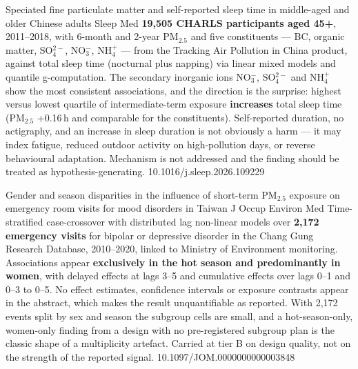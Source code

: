 \documentclass[10pt]{article}
\begin{document}
\clearpage


{Speciated fine particulate matter and self-reported sleep time in middle-aged and older
Chinese adults}
{Sleep Med}
{\textbf{19{,}505 CHARLS participants aged 45+}, 2011--2018, with 6-month and 2-year
PM$_{2.5}$ and five constituents --- BC, organic matter, SO$_4^{2-}$, NO$_3^-$,
NH$_4^+$ --- from the Tracking Air Pollution in China product, against total sleep time
(nocturnal plus napping) via linear mixed models and quantile g-computation. The
secondary inorganic ions NO$_3^-$, SO$_4^{2-}$ and NH$_4^+$ show the most consistent
associations, and the direction is the surprise: highest versus lowest quartile of
intermediate-term exposure \textbf{increases} total sleep time (PM$_{2.5}$ +0.16\,h and
comparable for the constituents). Self-reported duration, no actigraphy, and an
increase in sleep duration is not obviously a harm --- it may index fatigue, reduced
outdoor activity on high-pollution days, or reverse behavioural adaptation. Mechanism is
not addressed and the finding should be treated as hypothesis-generating.}
{10.1016/j.sleep.2026.109229}

{Gender and season disparities in the influence of short-term PM$_{2.5}$ exposure on
emergency room visits for mood disorders in Taiwan}
{J Occup Environ Med}
{Time-stratified case-crossover with distributed lag non-linear models over
\textbf{2{,}172 emergency visits} for bipolar or depressive disorder in the Chang Gung
Research Database, 2010--2020, linked to Ministry of Environment monitoring. Associations
appear \textbf{exclusively in the hot season and predominantly in women}, with delayed
effects at lags 3--5 and cumulative effects over lags 0--1 and 0--3 to 0--5. No effect
estimates, confidence intervals or exposure contrasts appear in the abstract, which makes
the result unquantifiable as reported. With 2{,}172 events split by sex and season the
subgroup cells are small, and a hot-season-only, women-only finding from a design with no
pre-registered subgroup plan is the classic shape of a multiplicity artefact. Carried at
tier B on design quality, not on the strength of the reported signal.}
{10.1097/JOM.0000000000003848}

\clearpage

\end{document}
